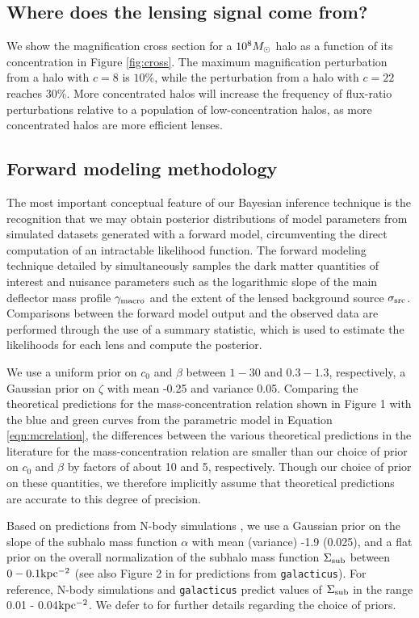 \subsection{Where does the lensing signal come from?}

We show the magnification cross section for a $10^{8} {M_{\odot}}$ halo as a function of its concentration in Figure \ref{fig:cross}. The maximum magnification perturbation from a halo with $c=8$ is $10\%$, while the perturbation from a halo with $c = 22$ reaches $30 \%$. More concentrated halos will increase the frequency of flux-ratio perturbations relative to a population of low-concentration halos, as more concentrated halos are more efficient lenses. 

\subsection{Forward modeling methodology}
The most important conceptual feature of our Bayesian inference technique is the recognition that we may obtain posterior distributions of model parameters from simulated datasets generated with a forward model, circumventing the direct computation of an intractable likelihood function. The forward modeling technique detailed by \citet{Gilman++19b} simultaneously samples the dark matter quantities of interest and nuisance parameters such as the logarithmic slope of the main deflector mass profile $\gamma_{\rm{macro}}$ and the extent of the lensed background source $\sigma_{\rm{src}}$. Comparisons between the forward model output and the observed data are performed through the use of a summary statistic, which is used to estimate the likelihoods for each lens and compute the posterior. 

We use a uniform prior on $c_0$ and $\beta$ between $1 - 30$ and $0.3 - 1.3$, respectively, a Gaussian prior on $\zeta$ with mean -0.25 and variance 0.05. Comparing the theoretical predictions for the mass-concentration relation shown in Figure 1 with the blue and green curves from the parametric model in Equation \ref{eqn:mcrelation}, the differences between the various theoretical predictions in the literature for the mass-concentration relation are smaller than our choice of prior on $c_0$ and $\beta$ by factors of about 10 and 5, respectively. Though our choice of prior on these quantities, we therefore implicitly assume that theoretical predictions are accurate to this degree of precision. 

Based on predictions from N-body simulations \citep{Springel++08,Fiacconi++16}, we use a Gaussian prior on the slope of the subhalo mass function $\alpha$ with mean (variance) -1.9 (0.025), and a flat prior on the overall normalization of the subhalo mass function $\Sigma_{\rm{sub}}$ between $0 - 0.1 \rm{kpc^{-2}}$ (see also Figure 2 in \citet{Gilman++19b} for predictions from {\tt{galacticus}}). For reference, N-body simulations and {\tt{galacticus}} predict values of $\Sigma_{\rm{sub}}$ in the range 0.01 - 0.04$\rm{kpc^{-2}}$. We defer to \citet{Gilman++19b} for further details regarding the choice of priors.


